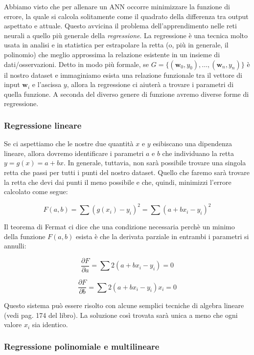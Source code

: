 \documentclass[10pt,a4paper]{article}
\newcommand{\ww}{\mathbf{w}}
\begin{document}
Abbiamo visto che per allenare un ANN occorre minimizzare la funzione di errore, la quale si calcola solitamente come il quadrato della differenza tra output aspettato e attuale. Questo avvicina il problema dell'apprendimento nelle reti neurali a quello più generale della \emph{regressione}. La regressione è una tecnica molto usata in analisi e in statistica per estrapolare la retta (o, più in generale, il polinomio) che meglio approssima la relazione esistente in un insieme di dati/osservazioni. Detto in modo più formale, se $G = \{(\ww_0,y_0), \dots, (\ww_n,y_n)\}$ è il nostro dataset e immaginiamo esista una relazione funzionale tra il vettore di input $\ww_i$ e l'ascissa $y$, allora la regressione ci aiuterà a trovare i parametri di quella funzione. A seconda del diverso genere di funzione avremo diverse forme di regressione.

\subsubsection{Regressione lineare}

Se ci aspettiamo che le nostre due quantità $x$ e $y$ esibiscano una dipendenza lineare, allora dovremo identificare i parametri $a$ e $b$ che individuano la retta $y = g(x) = a + bx$. In generale, tuttavia, non sarà possibile trovare una singola retta che passi per tutti i punti del nostro dataset. Quello che faremo sarà trovare la retta che devi dai punti il meno possibile e che, quindi, minimizzi l'errore calcolato come segue: 

$$
F(a,b) = \sum(g(x_i) - y_i)^2 = \sum(a + bx_i - y_i)^2
$$

Il teorema di Fermat ci dice che una condizione necessaria perchè un minimo della funzione $F(a,b)$ esista è che la derivata parziale in entrambi i parametri si annulli:

$$
\frac{\partial F}{\partial a} = \sum 2(a + bx_i - y_i) = 0
$$

$$
\frac{\partial F}{\partial b} = \sum 2(a + bx_i - y_i)x_i = 0
$$

Questo sistema può essere risolto con alcune semplici tecniche di algebra lineare (vedi pag. 174 del libro). La soluzione così trovata sarà unica a meno che ogni valore $x_i$ sia identico. 

\subsubsection{Regressione polinomiale e multilineare}
\end{document}
